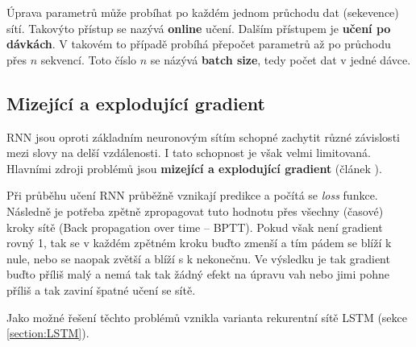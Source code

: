Úprava parametrů může probíhat po každém jednom průchodu dat (sekevence) sítí. Takovýto přístup se nazývá \textbf{online} učení. Dalším přístupem je \textbf{učení po dávkách}. V takovém to případě probíhá přepočet parametrů až po průchodu přes $n$ sekvencí. Toto číslo $n$ se názývá \textbf{batch size}, tedy počet dat v jedné dávce.

%
%
%


\subsection{Mizející a explodující gradient} \label{subsection:gradient}
RNN jsou oproti základním neuronovým sítím schopné zachytit různé závislosti mezi slovy na delší vzdálenosti. I tato schopnost je však velmi limitovaná. Hlavními zdroji problémů jsou \textbf{mizející a explodující gradient} (článek \cite{gradientProblems}).
%

Při průběhu učení RNN průběžně vznikají predikce a počítá se \emph{loss} funkce. Následně je potřeba zpětně zpropagovat tuto hodnotu přes všechny (časové) kroky sítě (Back propagation over time -- BPTT). Pokud však není gradient rovný 1, tak se v každém zpětném kroku buďto zmenší a tím pádem se blíží k nule, nebo se naopak zvětší a blíží s k nekonečnu. Ve výsledku je tak gradient buďto příliš malý a nemá tak tak žádný efekt na úpravu vah nebo jimi pohne příliš a tak zaviní špatné učení se sítě.

Jako možné řešení těchto problémů vznikla varianta rekurentní sítě LSTM (sekce \ref{section:LSTM}).


